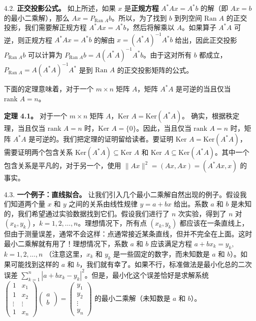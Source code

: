 4.2. \textbf{正交投影公式。} 如上所述，如果 $x$ 是\textbf{正规方程} $A^*Ax = A^*b$ 的解（即 $Ax = b$ 的最小二乘解），那么 $Ax = P_{\text{Ran } A} b$。所以，为了找到 $b$ 到列空间 $\text{Ran } A$ 的正交投影，我们需要解正规方程 $A^*Ax = A^*b$，然后将解乘以 $A$。如果算子 $A^*A$ 可逆，则正规方程 $A^*Ax = A^*b$ 的解由 $x = (A^*A)^{-1}A^*b$ 给出，因此正交投影 $P_{\text{Ran } A} b$ 可以计算为 $P_{\text{Ran } A} b = A(A^*A)^{-1}A^*b$。由于这对所有 $b$ 都成立，
$P_{\text{Ran } A} = A(A^*A)^{-1}A^*$
是到 $\text{Ran } A$ 的正交投影矩阵的公式。




下面的定理意味着，对于一个 $m \times n$ 矩阵 $A$，矩阵 $A^*A$ 是可逆的当且仅当 $\text{rank } A = n$。

\textbf{定理 4.1。} 对于一个 $m \times n$ 矩阵 $A$，$\text{Ker } A = \text{Ker}(A^*A)$。
确实，根据秩定理，当且仅当 $\text{rank } A = n$ 时，$\text{Ker } A = \{0\}$。因此，当且仅当 $\text{rank } A = n$ 时，矩阵 $A^*A$ 是可逆的。我们把定理的证明留给读者。要证明 $\text{Ker } A = \text{Ker}(A^*A)$，需要证明两个包含关系 $\text{Ker}(A^*A) \subseteq \text{Ker } A$ 和 $\text{Ker } A \subseteq \text{Ker}(A^*A)$。其中一个包含关系是平凡的，对于另一个，使用 $\|Ax\|^2 = (Ax, Ax) = (A^*Ax, x)$ 的事实。

4.3. \textbf{一个例子：直线拟合。} 让我们引入几个最小二乘解自然出现的例子。假设我们知道两个量 $x$ 和 $y$ 之间的关系由线性规律 $y = a + bx$ 给出。系数 $a$ 和 $b$ 是未知的，我们希望通过实验数据找到它们。假设我们进行了 $n$ 次实验，得到了 $n$ 对 $(x_k, y_k)$，$k=1, 2, \dots, n$。理想情况下，所有点 $(x_k, y_k)$ 都应该在一条直线上，但由于测量误差，通常不会这样：点通常接近某条直线，但并不完全在上面。这时最小二乘解就有用了！理想情况下，系数 $a$ 和 $b$ 应该满足方程
$a + bx_k = y_k$, $k = 1, 2, \dots, n$
（注意这里，$x_k$ 和 $y_k$ 是一些固定的数字，而未知数是 $a$ 和 $b$）。如果可能找到这样的 $a$ 和 $b$，我们就有幸了。如果不行，标准做法是最小化总的二次误差 $\sum_{k=1}^n |a + bx_k - y_k|^2$。但是，最小化这个误差恰好是求解系统
$\begin{pmatrix} 1 & x_1 \\ 1 & x_2 \\ \vdots & \vdots \\ 1 & x_n \end{pmatrix} \begin{pmatrix} a \\ b \end{pmatrix} = \begin{pmatrix} y_1 \\ y_2 \\ \vdots \\ y_n \end{pmatrix}$
的最小二乘解（未知数是 $a$ 和 $b$）。

